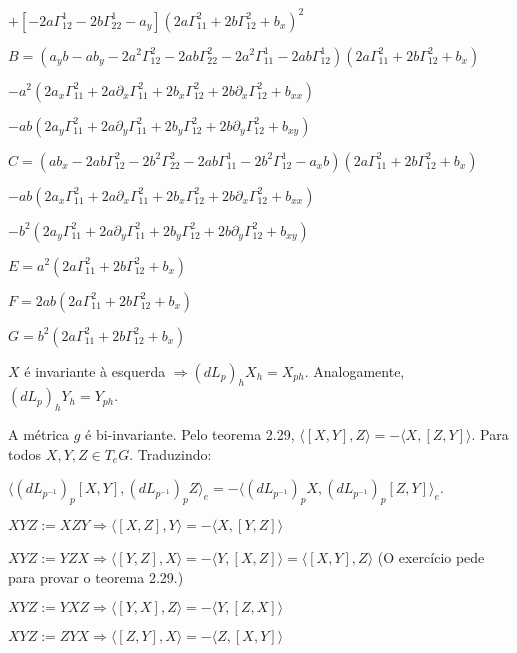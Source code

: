\documentclass[10pt,a4paper]{article}
\begin{document}
		$+ [-2a\Gamma_{12}^1 - 2b\Gamma_{22}^1 - a_y ](2a\Gamma_{11}^2 + 2b\Gamma_{12}^2 + b_x)^2$

		$B = (a_y b - ab_y - 2 a^2 \Gamma_{12}^2- 2ab \Gamma_{22}^2 -2a^2\Gamma_{11}^1 - 2ab\Gamma_{12}^1)(2a\Gamma_{11}^2 + 2b\Gamma_{12}^2 + b_x)$

		$- a^2(2a_x \Gamma_{11}^2 + 2a \partial_x \Gamma_{11}^2 + 2b_x\Gamma_{12}^2 + 2b\partial_x \Gamma_{12}^2 + b_{xx})$

		$- ab(2a_y \Gamma_{11}^2 + 2a \partial_y \Gamma_{11}^2 + 2b_y\Gamma_{12}^2 + 2b\partial_y \Gamma_{12}^2 + b_{xy})$

		$C = (ab_x- 2 ab\Gamma_{12}^2 - 2b^2\Gamma_{22}^2 -2ab\Gamma_{11}^1 - 2b^2\Gamma_{12}^1 - a_x b)(2a\Gamma_{11}^2 + 2b\Gamma_{12}^2 + b_x)$

		$- ab(2a_x \Gamma_{11}^2 + 2a \partial_x \Gamma_{11}^2 + 2b_x\Gamma_{12}^2 + 2b\partial_x \Gamma_{12}^2 + b_{xx})$

		$- b^2(2a_y \Gamma_{11}^2 + 2a \partial_y \Gamma_{11}^2 + 2b_y\Gamma_{12}^2 + 2b\partial_y \Gamma_{12}^2 + b_{xy})$

		$E = a^2(2a\Gamma_{11}^2 + 2b\Gamma_{12}^2 + b_x)$

		$F = 2ab(2a\Gamma_{11}^2 + 2b\Gamma_{12}^2 + b_x)$

		$G = b^2(2a\Gamma_{11}^2 + 2b\Gamma_{12}^2 + b_x)$

		\vspace{3mm}

		$X$ \'e invariante \`a esquerda $\Rightarrow (dL_p)_h X_h = X_{ph}$. Analogamente, $(dL_p)_h Y_h = Y_{ph}$.

		A m\'etrica $g$ \'e bi-invariante. Pelo teorema 2.29, $\langle [X, Y], Z \rangle = - \langle X, [Z, Y] \rangle$. Para todos $X, Y, Z \in T_eG$. Traduzindo:

		$\langle (dL_{p^{-1}})_p [X,Y], (dL_{p^{-1}})_p Z \rangle_e = - \langle (dL_{p^{-1}})_p X, (dL_{p^{-1}})_p [Z,Y] \rangle_e$.

		$XYZ := XZY \Rightarrow \langle [X, Z], Y \rangle = - \langle X, [Y, Z] \rangle$

		$XYZ := YZX \Rightarrow \langle [Y, Z], X \rangle = - \langle Y, [X, Z] \rangle = \langle [X, Y], Z \rangle$ (O exerc\'icio pede para provar o teorema 2.29.)

		$XYZ := YXZ \Rightarrow \langle [Y, X], Z \rangle = - \langle Y, [Z, X] \rangle$

		$XYZ := ZYX \Rightarrow \langle [Z, Y], X \rangle = - \langle Z, [X, Y] \rangle$
\end{document}
